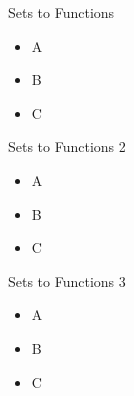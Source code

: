 \begin{frame}{Sets to Functions}
    \begin{itemize}
        \item A
        \item B
        \item C
    \end{itemize}
\end{frame}

\begin{frame}{Sets to Functions 2}
    \begin{itemize}
        \item A
        \item B
        \item C
    \end{itemize}
\end{frame}

\begin{frame}{Sets to Functions 3}
    \begin{itemize}
        \item A
        \item B
        \item C
    \end{itemize}
\end{frame}